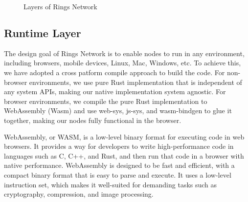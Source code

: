\documentclass[twocolumn]{article}
\begin{document}
\begin{figure}[htbp]
\centering
{}
\caption{Layers of Rings Network}
\end{figure}





\subsection{Runtime Layer}

The design goal of Rings Network is to enable nodes to run in any environment, including browsers, mobile devices, Linux, Mac, Windows, etc. To achieve this, we have adopted a cross patform compile approach to build the code. For non-browser environments, we use pure Rust implementation that is independent of any system APIs, making our native implementation system agnostic. For browser environments, we compile the pure Rust implementation to WebAssembly (Wasm) and use web-sys, js-sys, and wasm-bindgen to glue it together, making our nodes fully functional in the browser.


WebAssembly, or WASM, is a low-level binary format for executing code in web browsers. It provides a way for developers to write high-performance code in languages such as C, C++, and Rust, and then run that code in a browser with native performance. WebAssembly is designed to be fast and efficient, with a compact binary format that is easy to parse and execute. It uses a low-level instruction set, which makes it well-suited for demanding tasks such as cryptography, compression, and image processing.
\end{document}
